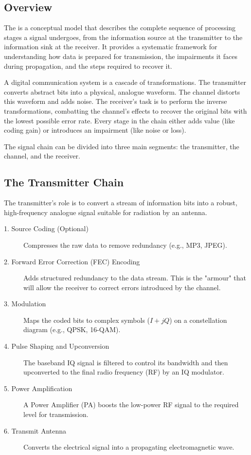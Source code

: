 \subsection{Overview}

The  is a conceptual model that describes the complete sequence of processing stages a signal undergoes, from the information source at the transmitter to the information sink at the receiver. It provides a systematic framework for understanding how data is prepared for transmission, the impairments it faces during propagation, and the steps required to recover it.

\begin{keyconcept}
    A digital communication system is a cascade of transformations. The transmitter converts abstract bits into a physical, analogue waveform. The channel distorts this waveform and adds noise. The receiver's task is to perform the inverse transformations, combatting the channel's effects to recover the original bits with the lowest possible error rate. Every stage in the chain either adds value (like coding gain) or introduces an impairment (like noise or loss).
\end{keyconcept}

The signal chain can be divided into three main segments: the transmitter, the channel, and the receiver.


\subsection{The Transmitter Chain}

The transmitter's role is to convert a stream of information bits into a robust, high-frequency analogue signal suitable for radiation by an antenna.

\begin{description}
    \item[1. Source Coding (Optional)] Compresses the raw data to remove redundancy (e.g., MP3, JPEG).
    \item[2. Forward Error Correction (FEC) Encoding] Adds structured redundancy to the data stream. This is the "armour" that will allow the receiver to correct errors introduced by the channel.
    \item[3. Modulation] Maps the coded bits to complex symbols ($I+jQ$) on a constellation diagram (e.g., QPSK, 16-QAM).
    \item[4. Pulse Shaping and Upconversion] The baseband IQ signal is filtered to control its bandwidth and then upconverted to the final radio frequency (RF) by an IQ modulator.
    \item[5. Power Amplification] A Power Amplifier (PA) boosts the low-power RF signal to the required level for transmission.
    \item[6. Transmit Antenna] Converts the electrical signal into a propagating electromagnetic wave.
\end{description}


